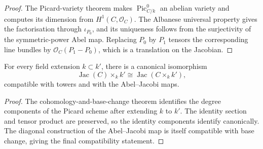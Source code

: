\begin{proof}
  The Picard-variety theorem makes \(\operatorname{Pic}^0_{C/k}\) an abelian
  variety and computes its dimension from \(H^1(C,\mathcal O_C)\).  The
  Albanese universal property gives the factorisation through
  \(\iota_{P_0}\), and its uniqueness follows from the surjectivity of the
  symmetric-power Abel map.  Replacing \(P_0\) by \(P_1\) tensors the
  corresponding line bundles by \(\mathcal O_C(P_1-P_0)\), which is a
  translation on the Jacobian.
\end{proof}

\begin{theorem}
  \label{pa-thm-jacobian-base-change}
  \cite{kleiman-picard}
  For every field extension \(k\subset k'\), there is a canonical isomorphism
  \[
    \operatorname{Jac}(C)\times_k k'\cong
    \operatorname{Jac}(C\times_k k'),
  \]
  compatible with towers and with the Abel--Jacobi maps.
\end{theorem}

\begin{proof}
  The cohomology-and-base-change theorem identifies the degree components of
  the Picard scheme after extending \(k\) to \(k'\).  The identity section and
  tensor product are preserved, so the identity components identify
  canonically.  The diagonal construction of the Abel--Jacobi map is itself
  compatible with base change, giving the final compatibility statement.
\end{proof}
